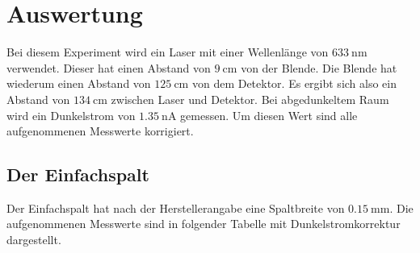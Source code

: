 \section{Auswertung}
\label{sec:Auswertung}
Bei diesem Experiment wird ein Laser mit einer Wellenlänge von $\SI{633}{\nano\meter}$
verwendet. Dieser hat einen Abstand von $\SI{9}{\centi\meter}$ von der Blende.
Die Blende hat wiederum einen Abstand von $\SI{125}{\centi\meter}$ von dem Detektor.
Es ergibt sich also ein Abstand von $\SI{134}{\centi\meter}$ zwischen Laser und Detektor.
Bei abgedunkeltem Raum wird ein Dunkelstrom von $\SI{1.35}{\nano\ampere}$ gemessen.
Um diesen Wert sind alle aufgenommenen Messwerte korrigiert.

\subsection{Der Einfachspalt}
Der Einfachspalt hat nach der Herstellerangabe eine Spaltbreite von $\SI{0.15}{\milli\meter}$.
Die aufgenommenen Messwerte sind in folgender Tabelle mit Dunkelstromkorrektur
dargestellt.

